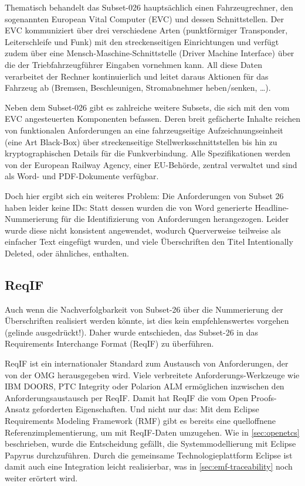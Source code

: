 \documentclass[twoside]{article}
\begin{document}
\begin{multicols}{2}
Thematisch behandelt das \glqq{}Subset-026\grqq{} hauptsächlich einen Fahrzeugrechner, den sogenannten European Vital Computer (EVC) und dessen Schnittstellen. Der EVC kommuniziert über drei verschiedene Arten (punktförmiger Transponder, Leiterschleife und Funk) mit den streckenseitigen Einrichtungen und verfügt zudem über eine Mensch-Maschine-Schnittstelle (Driver Machine Interface) über die der Triebfahrzeugführer Eingaben vornehmen kann. All diese Daten verarbeitet der Rechner kontinuierlich und leitet daraus Aktionen für das Fahrzeug ab (Bremsen, Beschleunigen, Stromabnehmer heben/senken, \ldots ).

Neben dem \glqq{}Subset-026\grqq{} gibt es zahlreiche weitere Subsets, die sich mit den vom EVC angesteuerten Komponenten befassen. Deren breit gefächerte Inhalte reichen von funktionalen Anforderungen an eine fahrzeugseitige Aufzeichnungseinheit (eine Art \glqq{}Black-Box\grqq{}) über streckenseitige Stellwerksschnittstellen bis hin zu kryptographischen Details für die Funkverbindung. Alle Spezifikationen werden von der European Railway Agency, einer EU-Behörde, zentral verwaltet und sind als Word- und PDF-Dokumente verfügbar.

Doch hier ergibt sich ein weiteres Problem: Die Anforderungen von Subset 26 haben leider keine IDs: Statt dessen wurden die von Word generierte Headline-Nummerierung für die Identifizierung von Anforderungen herangezogen. Leider wurde diese nicht konsistent angewendet, wodurch Querverweise teilweise als einfacher Text eingefügt wurden, und viele Überschriften den Titel \glqq{}Intentionally Deleted\grqq{}, oder ähnliches, enthalten.

\subsection{ReqIF}

Auch wenn die Nachverfolgbarkeit von Subset-26 über die Nummerierung der Überschriften realisiert werden könnte, ist dies kein empfehlenswertes vorgehen (gelinde ausgedrückt!).  Daher wurde entschieden, das Subset-26 in das Requirements Interchange Format (ReqIF) zu überführen. 

ReqIF \cite{reqifolution} ist ein internationaler Standard zum Austausch von Anforderungen, der von der OMG herausgegeben wird.  Viele verbreitete Anforderungs-Werkzeuge wie IBM DOORS, PTC Integrity oder Polarion ALM ermöglichen inzwischen den Anforderungsaustausch per ReqIF.  Damit hat ReqIF die vom Open Proofs-Ansatz geforderten Eigenschaften.  Und nicht nur das: Mit dem Eclipse Requirements Modeling Framework (RMF) gibt es bereits eine quelloffnene Referenzimplementierung, um mit ReqIF-Daten umzugehen. Wie in \ref{sec:openetcs} beschrieben, wurde die Entscheidung gefällt, die Systemmodellierung mit Eclipse Papyrus durchzuführen.  Durch die gemeinsame Technologieplattform Eclipse ist damit auch eine Integration leicht realisierbar, was in \ref{sec:emf-traceability} noch weiter erörtert wird.


\end{multicols}
\end{document}
